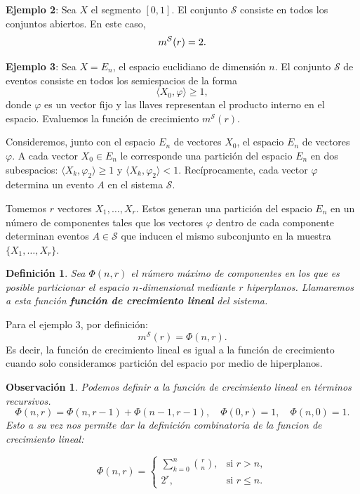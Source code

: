 \documentclass{report}
\newtheorem{dfn}{Definición}[subsection]
\newtheorem{obs}{Observación}[subsection]
\begin{document}
\textbf{Ejemplo 2}: Sea \( X \) el segmento \([0,1]\). El conjunto \( \mathcal{S} \) 
consiste en todos los conjuntos abiertos. En este caso,  
\[
m^{\mathcal{S}}(r) = 2.\newline
\]

\textbf{Ejemplo 3}: Sea \( X = E_n \), el espacio euclidiano de dimensión \( n \). 
El conjunto \( \mathcal{S} \) de eventos consiste en todos los semiespacios de la forma  
\[
\langle X_0, \varphi \rangle \geq 1,
\]  
donde \( \varphi \) es un vector fijo y las llaves representan el producto interno en el espacio.
 Evaluemos la función de crecimiento \( m^{\mathcal{S}}(r) \).\newline

Consideremos, junto con el espacio \( E_n \) de vectores \( X_0 \), el espacio \( E_n \) 
de vectores \( \varphi \). A cada vector \( X_0 \in E_n \) le corresponde una partición 
del espacio \( E_n \) en dos subespacios: \(\langle X_k, \varphi_2 \rangle \geq 1\) y \(\langle X_k, \varphi_2 \rangle < 1\). 
Recíprocamente, cada vector \(\varphi\) determina un evento $A$ en el sistema \(\mathcal{S}\).\newline

Tomemos \( r \) vectores \( X_1, \dots, X_r \). Estos generan una partición del espacio \( E_n \) 
en un número de componentes tales que los vectores \( \varphi \) dentro de cada componente determinan eventos 
\( A \in \mathcal{S} \) que inducen el mismo subconjunto en la muestra \( \{X_1, \dots, X_r \}\).\newline

\begin{dfn}
    Sea \( \Phi(n, r) \) el número máximo de componentes en los que es posible particionar el espacio \( n \)-dimensional 
mediante \( r \) hiperplanos. Llamaremos a esta función \textbf{función de crecimiento lineal} del sistema.
\end{dfn}


Para el ejemplo 3, por definición:
\[
    m^{\mathcal{S}}(r) = \Phi(n, r).
\]
Es decir, la función de crecimiento lineal es igual a la función de crecimiento cuando solo consideramos partición
del espacio por medio de hiperplanos.

\begin{obs}
Podemos definir a la función de crecimiento lineal en términos recursivos. 
\[
    \Phi(n, r) = \Phi(n, r - 1) + \Phi(n - 1, r - 1),\quad \Phi(0, r) = 1, \quad \Phi(n, 0) = 1.
\]
Esto a su vez nos permite dar la definición combinatoria de la funcion de crecimiento lineal:

\begin{equation}
\Phi(n, r) =
\begin{cases}
\sum\limits_{k=0}^{n} \binom{r}{n}, & \text{si } r > n, \\
2^r, & \text{si } r \leq n.
\end{cases}
\label{def: combinatoria función crecimiento lineal}
\end{equation}
\end{obs}
\end{document}
